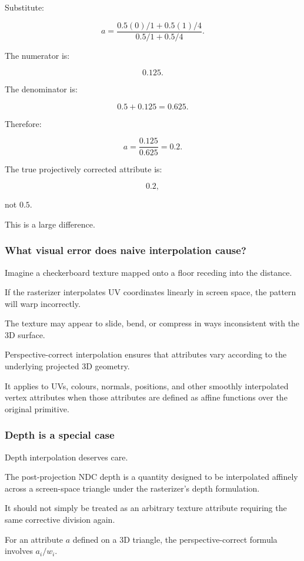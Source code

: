 Substitute:

\[
 a= \frac{ 0.5(0)/1+0.5(1)/4 }{ 0.5/1+0.5/4 }.
\]

The numerator is:

\[
 0.125.
\]

The denominator is:

\[
 0.5+0.125=0.625.
\]

Therefore:

\[
 \boxed{ a=\frac{0.125}{0.625}=0.2 }.
\]

The true projectively corrected attribute is:

\[
 \boxed{0.2},
\]

not \(0.5\).

This is a large difference.

\subsubsection{What visual error does naive interpolation cause?}\label{what-visual-error-does-naive-interpolation-cause}

Imagine a checkerboard texture mapped onto a floor receding into the distance.

If the rasterizer interpolates UV coordinates linearly in screen space, the pattern will warp incorrectly.

The texture may appear to slide, bend, or compress in ways inconsistent with the 3D surface.

Perspective-correct interpolation ensures that attributes vary according to the underlying projected 3D geometry.

It applies to UVs, colours, normals, positions, and other smoothly interpolated vertex attributes when those attributes are defined as affine functions over the original primitive.

\subsubsection{Depth is a special case}\label{depth-is-a-special-case}

Depth interpolation deserves care.

The post-projection NDC depth is a quantity designed to be interpolated affinely across a screen-space triangle under the rasterizer's depth formulation.

It should not simply be treated as an arbitrary texture attribute requiring the same corrective division again.

For an attribute \(a\) defined on a 3D triangle, the perspective-correct formula involves \(a_i/w_i\).

